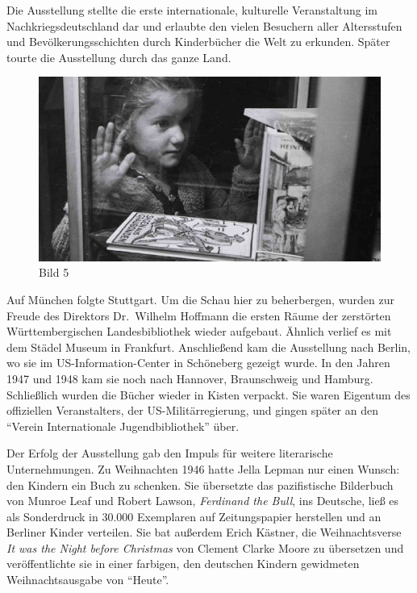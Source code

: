 \documentclass[a4paper,
fontsize=11pt,
oneside,
numbers=noperiodatend,
parskip=half-,
bibliography=totoc,
final
]{scrartcl}
\begin{document}
Die Ausstellung stellte die erste internationale, kulturelle
Veranstaltung im Nachkriegsdeutschland dar und erlaubte den vielen
Besuchern aller Altersstufen und Bevölkerungsschichten durch
Kinderbücher die Welt zu erkunden. Später tourte die Ausstellung durch
das ganze Land.~

\begin{figure}[htbp]
\centering
\includegraphics{img/Bild5.jpg}
\caption{Bild 5}
\end{figure}

Auf München folgte Stuttgart. Um die Schau hier zu beherbergen, wurden
zur Freude des Direktors Dr.~Wilhelm Hoffmann die ersten Räume der
zerstörten Württembergischen Landesbibliothek wieder aufgebaut. Ähnlich
verlief es mit dem Städel Museum in Frankfurt. Anschließend kam die
Ausstellung nach Berlin, wo sie im US-Information-Center in Schöneberg
gezeigt wurde. In den Jahren 1947 und 1948 kam sie noch nach Hannover,
Braunschweig und Hamburg. Schließlich wurden die Bücher wieder in Kisten
verpackt. Sie waren Eigentum des offiziellen Veranstalters, der
US-Militärregierung, und gingen später an den \enquote{Verein
Internationale Jugendbibliothek} über.

Der Erfolg der Ausstellung gab den Impuls für weitere literarische
Unternehmungen. Zu Weihnachten 1946 hatte Jella Lepman nur einen Wunsch:
den Kindern ein Buch zu schenken. Sie übersetzte das pazifistische
Bilderbuch von Munroe Leaf und Robert Lawson, \emph{Ferdinand the Bull},
ins Deutsche, ließ es als Sonderdruck in 30.000 Exemplaren auf
Zeitungspapier herstellen und an Berliner Kinder verteilen. Sie bat
außerdem Erich Kästner, die Weihnachtsverse \emph{It was the Night
before Christmas} von Clement Clarke Moore zu übersetzen und
veröffentlichte sie in einer farbigen, den deutschen Kindern gewidmeten
Weihnachtsausgabe von \enquote{Heute}.~
\end{document}

